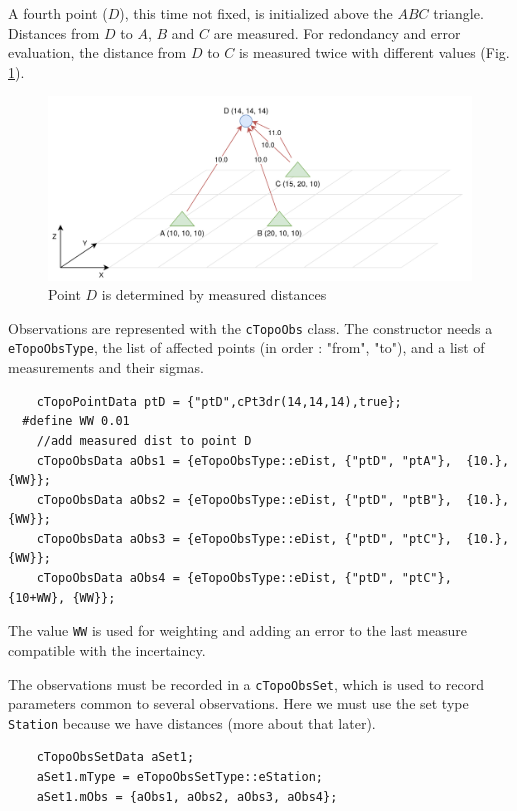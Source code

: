A fourth point ($D$), this time not fixed, is initialized above the $ABC$ triangle.
Distances from $D$ to $A$, $B$ and $C$
are measured. For redondancy and error evaluation, the distance from $D$ to $C$ is measured twice
with different values (Fig. \ref{fig:topoEx2}).

\begin{figure}[!h]
\centering
\includegraphics[width=12cm]{Programmer/benchtopo2.png}
\caption{Point $D$ is determined by measured distances}
\label{fig:topoEx2}
\end{figure}

Observations are represented with the \texttt{cTopoObs} class.
The constructor needs a \texttt{eTopoObsType}, the list of affected points
(in order : "from", "to"), and a list of measurements and their sigmas.

\begin{lstlisting}
    cTopoPointData ptD = {"ptD",cPt3dr(14,14,14),true};
  #define WW 0.01
    //add measured dist to point D
    cTopoObsData aObs1 = {eTopoObsType::eDist, {"ptD", "ptA"},  {10.}, {WW}};
    cTopoObsData aObs2 = {eTopoObsType::eDist, {"ptD", "ptB"},  {10.}, {WW}};
    cTopoObsData aObs3 = {eTopoObsType::eDist, {"ptD", "ptC"},  {10.}, {WW}};
    cTopoObsData aObs4 = {eTopoObsType::eDist, {"ptD", "ptC"},  {10+WW}, {WW}};
\end{lstlisting}

The value \texttt{WW} is used for weighting and adding an error to the last measure
compatible with the incertaincy.

The observations must be recorded in a \texttt{cTopoObsSet}, which is used to
record parameters common to several observations.
Here we must use the set type \texttt{Station} because we have distances (more about that later).

\begin{lstlisting}
    cTopoObsSetData aSet1;
    aSet1.mType = eTopoObsSetType::eStation;
    aSet1.mObs = {aObs1, aObs2, aObs3, aObs4};
\end{lstlisting}


